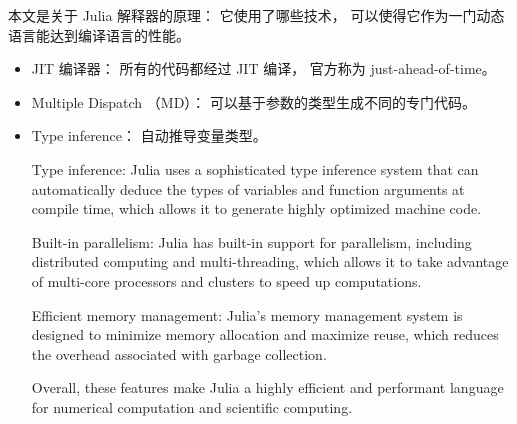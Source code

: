 
\begin{issues}
\issueDraft
\end{issues}

本文是关于 Julia 解释器的原理： 它使用了哪些技术， 可以使得它作为一门动态语言能达到编译语言的性能。

\begin{itemize}
\item JIT 编译器： 所有的代码都经过 JIT 编译， 官方称为 just-ahead-of-time。
\item Multiple Dispatch （MD）： 可以基于参数的类型生成不同的专门代码。
\item Type inference： 自动推导变量类型。

Type inference: Julia uses a sophisticated type inference system that can automatically deduce the types of variables and function arguments at compile time, which allows it to generate highly optimized machine code.

Built-in parallelism: Julia has built-in support for parallelism, including distributed computing and multi-threading, which allows it to take advantage of multi-core processors and clusters to speed up computations.

Efficient memory management: Julia's memory management system is designed to minimize memory allocation and maximize reuse, which reduces the overhead associated with garbage collection.

Overall, these features make Julia a highly efficient and performant language for numerical computation and scientific computing.
\end{itemize}


